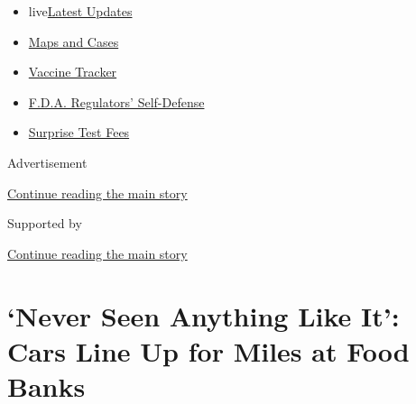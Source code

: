 \begin{itemize}
\tightlist
\item
  live\href{https://www.nytimes3xbfgragh.onion/2020/09/12/world/covid-19-coronavirus.html?name=styln-coronavirus-markets\&region=TOP_BANNER\&block=storyline_menu_recirc\&action=click\&pgtype=Article\&impression_id=1215e660-f52d-11ea-953b-e7f6208efedb\&variant=undefined}{Latest
  Updates}
\item
  \href{https://www.nytimes3xbfgragh.onion/interactive/2020/us/coronavirus-us-cases.html?name=styln-coronavirus-markets\&region=TOP_BANNER\&block=storyline_menu_recirc\&action=click\&pgtype=Article\&impression_id=1215e661-f52d-11ea-953b-e7f6208efedb\&variant=undefined}{Maps
  and Cases}
\item
  \href{https://www.nytimes3xbfgragh.onion/interactive/2020/science/coronavirus-vaccine-tracker.html?name=styln-coronavirus-markets\&region=TOP_BANNER\&block=storyline_menu_recirc\&action=click\&pgtype=Article\&impression_id=1215e662-f52d-11ea-953b-e7f6208efedb\&variant=undefined}{Vaccine
  Tracker}
\item
  \href{https://www.nytimes3xbfgragh.onion/2020/09/10/us/politics/fda-coronavirus-vaccine.html?name=styln-coronavirus-markets\&region=TOP_BANNER\&block=storyline_menu_recirc\&action=click\&pgtype=Article\&impression_id=1215e663-f52d-11ea-953b-e7f6208efedb\&variant=undefined}{F.D.A.
  Regulators' Self-Defense}
\item
  \href{https://www.nytimes3xbfgragh.onion/2020/09/09/upshot/coronavirus-surprise-test-fees.html?name=styln-coronavirus-markets\&region=TOP_BANNER\&block=storyline_menu_recirc\&action=click\&pgtype=Article\&impression_id=1215e664-f52d-11ea-953b-e7f6208efedb\&variant=undefined}{Surprise
  Test Fees}
\end{itemize}

Advertisement

\protect\hyperlink{after-top}{Continue reading the main story}

Supported by

\protect\hyperlink{after-sponsor}{Continue reading the main story}

\hypertarget{never-seen-anything-like-it-cars-line-up-for-miles-at-food-banks}{%
\section{`Never Seen Anything Like It': Cars Line Up for Miles at Food
Banks}\label{never-seen-anything-like-it-cars-line-up-for-miles-at-food-banks}}

